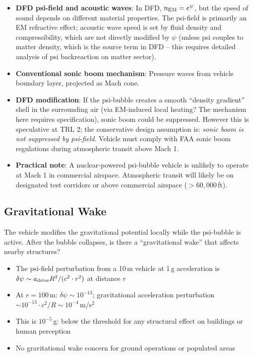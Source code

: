 \documentclass[11pt,a4paper]{article}
\begin{document}
\begin{itemize}
  \item \textbf{DFD psi-field and acoustic waves}: In DFD, $n_{\rm EM}
    = e^\psi$, but the speed of sound depends on different material
    properties. The psi-field is primarily an EM refractive effect;
    acoustic wave speed is set by fluid density and compressibility,
    which are not directly modified by $\psi$ (unless psi couples to
    matter density, which is the source term in DFD -- this requires
    detailed analysis of psi backreaction on matter sector).
  \item \textbf{Conventional sonic boom mechanism}: Pressure waves from
    vehicle boundary layer, projected as Mach cone.
  \item \textbf{DFD modification}: If the psi-bubble creates a smooth
    ``density gradient'' shell in the surrounding air (via EM-induced
    local heating? The mechanism here requires specification), sonic
    boom could be suppressed. However this is speculative at TRL 2;
    the conservative design assumption is: \textit{sonic boom is not
    suppressed by psi-field}. Vehicle must comply with FAA sonic boom
    regulations during atmospheric transit above Mach 1.
  \item \textbf{Practical note}: A nuclear-powered psi-bubble vehicle
    is unlikely to operate at Mach 1 in commercial airspace. Atmospheric
    transit will likely be on designated test corridors or above
    commercial airspace ($> 60,000$\,ft).
\end{itemize}

\subsection{Gravitational Wake}

The vehicle modifies the gravitational potential locally while the
psi-bubble is active. After the bubble collapses, is there a
``gravitational wake'' that affects nearby structures?

\begin{itemize}
  \item The psi-field perturbation from a 10\,m vehicle at 1\,g
    acceleration is $\delta\psi \sim a_{\rm drive} R^2 / (c^2 \cdot r^2)$
    at distance $r$
  \item At $r = 100$\,m: $\delta\psi \sim 10^{-13}$; gravitational
    acceleration perturbation $\sim 10^{-13} \cdot c^2 / R \sim 10^{-4}$\,m/s$^2$
  \item This is $10^{-5}$\,g: below the threshold for any structural effect
    on buildings or human perception
  \item No gravitational wake concern for ground operations or populated areas
\end{itemize}
\end{document}
